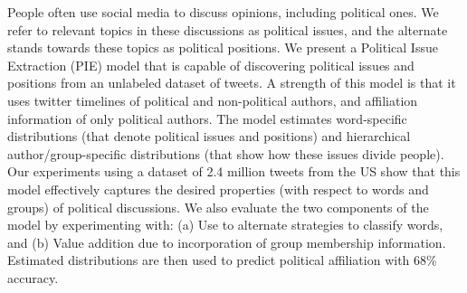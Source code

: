 People often use social media to discuss opinions, including political ones. We refer to relevant topics in these discussions as political issues, and the alternate stands towards these topics as political positions. We present a Political Issue Extraction (PIE) model that is capable of discovering political issues and positions from an unlabeled dataset of tweets. A strength of this model is that it uses twitter timelines of political and non-political authors, and affiliation information of only political authors. The model estimates word-specific distributions (that denote political issues and positions) and hierarchical author/group-specific distributions (that show how these issues divide people). Our experiments using a dataset of 2.4 million tweets from the US show that this model effectively captures the desired properties (with respect to words and groups) of political discussions. We also evaluate the two components of the model by experimenting with: (a) Use to alternate strategies to classify words, and (b) Value addition due to incorporation of group membership information. Estimated distributions are then used to predict political affiliation with 68\% accuracy.
